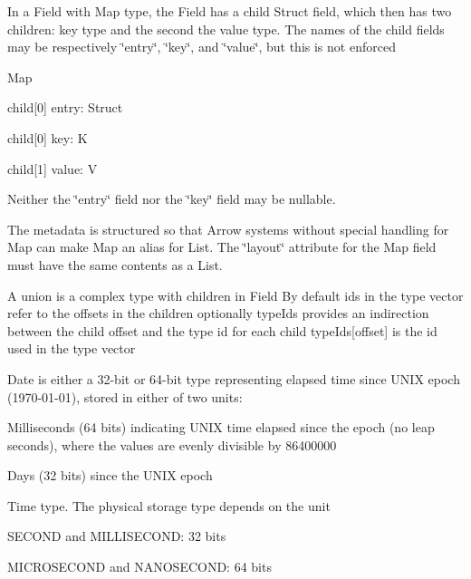 In a Field with Map type, the Field has a child Struct field, which then has two children\+: key type and the second the value type. The names of the child fields may be respectively \char`\"{}entry\char`\"{}, \char`\"{}key\char`\"{}, and \char`\"{}value\char`\"{}, but this is not enforced

Map
\begin{DoxyItemize}
\item child\mbox{[}0\mbox{]} entry\+: Struct
\begin{DoxyItemize}
\item child\mbox{[}0\mbox{]} key\+: K
\item child\mbox{[}1\mbox{]} value\+: V
\end{DoxyItemize}
\end{DoxyItemize}

Neither the \char`\"{}entry\char`\"{} field nor the \char`\"{}key\char`\"{} field may be nullable.

The metadata is structured so that Arrow systems without special handling for Map can make Map an alias for List. The \char`\"{}layout\char`\"{} attribute for the Map field must have the same contents as a List.

A union is a complex type with children in Field By default ids in the type vector refer to the offsets in the children optionally type\+Ids provides an indirection between the child offset and the type id for each child type\+Ids\mbox{[}offset\mbox{]} is the id used in the type vector

Date is either a 32-\/bit or 64-\/bit type representing elapsed time since U\+N\+IX epoch (1970-\/01-\/01), stored in either of two units\+:


\begin{DoxyItemize}
\item Milliseconds (64 bits) indicating U\+N\+IX time elapsed since the epoch (no leap seconds), where the values are evenly divisible by 86400000
\item Days (32 bits) since the U\+N\+IX epoch
\end{DoxyItemize}

Time type. The physical storage type depends on the unit
\begin{DoxyItemize}
\item S\+E\+C\+O\+ND and M\+I\+L\+L\+I\+S\+E\+C\+O\+ND\+: 32 bits
\item M\+I\+C\+R\+O\+S\+E\+C\+O\+ND and N\+A\+N\+O\+S\+E\+C\+O\+ND\+: 64 bits
\end{DoxyItemize}

